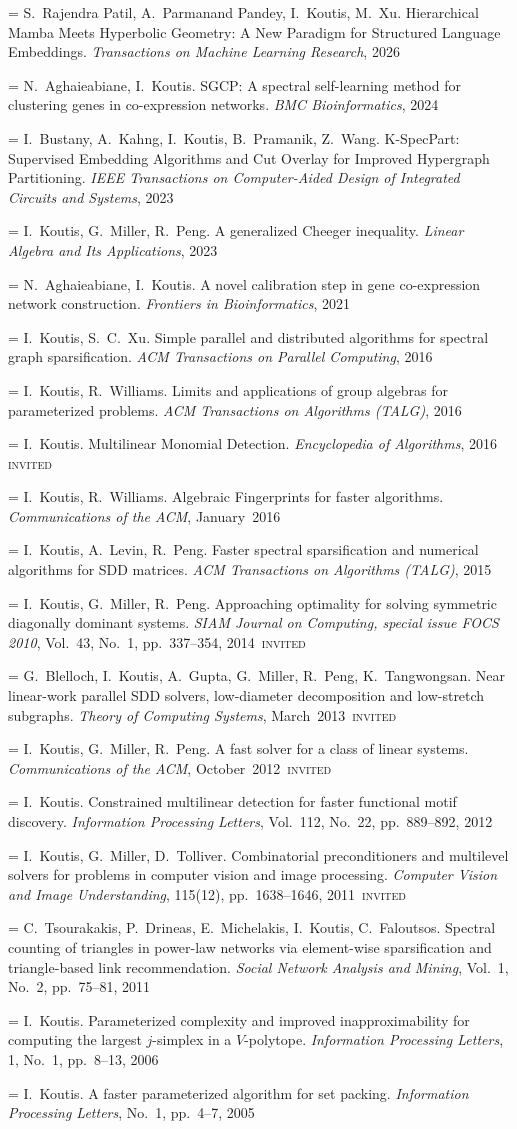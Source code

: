 \documentclass[11pt,letterpaper]{article}
\newlength{\datecol}\setlength{\datecol}{1.06in}
\newlength{\entrysep}\setlength{\entrysep}{4pt}
\newcommand{\datefont}{\small\color{muted}}
\newcommand{\badge}[1]{\,{\setlength{\fboxsep}{1.4pt}%
  \colorbox{accentlight}{\textcolor{accent}{\footnotesize\textsc{#1}}}}}
\newcommand{\me}{I.~Koutis}
\newcommand{\pub}[4]{\par\addvspace{\entrysep}\noindent\hangindent=\datecol\hangafter=1
  \makebox[\datecol][l]{\datefont [#1]}#2. #3. \textit{#4}}
\begin{document}
\pub{18}{S.~Rajendra Patil, A.~Parmanand Pandey, \me, M.~Xu}
  {Hierarchical Mamba Meets Hyperbolic Geometry: A New Paradigm for Structured Language Embeddings}
  {Transactions on Machine Learning Research}, 2026
\pub{17}{N.~Aghaieabiane, \me}
  {SGCP: A spectral self-learning method for clustering genes in co-expression networks}
  {BMC Bioinformatics}, 2024
\pub{16}{I.~Bustany, A.~Kahng, \me, B.~Pramanik, Z.~Wang}
  {K-SpecPart: Supervised Embedding Algorithms and Cut Overlay for Improved Hypergraph Partitioning}
  {IEEE Transactions on Computer-Aided Design of Integrated Circuits and Systems}, 2023
\pub{15}{\me, G.~Miller, R.~Peng}
  {A generalized Cheeger inequality}
  {Linear Algebra and Its Applications}, 2023
\pub{14}{N.~Aghaieabiane, \me}
  {A novel calibration step in gene co-expression network construction}
  {Frontiers in Bioinformatics}, 2021
\pub{13}{\me, S.~C.~Xu}
  {Simple parallel and distributed algorithms for spectral graph sparsification}
  {ACM Transactions on Parallel Computing}, 2016
\pub{12}{\me, R.~Williams}
  {Limits and applications of group algebras for parameterized problems}
  {ACM Transactions on Algorithms (TALG)}, 2016
\pub{11}{\me}
  {Multilinear Monomial Detection}
  {Encyclopedia of Algorithms}, 2016\badge{invited}
\pub{10}{\me, R.~Williams}
  {Algebraic Fingerprints for faster algorithms}
  {Communications of the ACM}, January~2016
\pub{9}{\me, A.~Levin, R.~Peng}
  {Faster spectral sparsification and numerical algorithms for SDD matrices}
  {ACM Transactions on Algorithms (TALG)}, 2015
\pub{8}{\me, G.~Miller, R.~Peng}
  {Approaching optimality for solving symmetric diagonally dominant systems}
  {SIAM Journal on Computing, special issue FOCS 2010}, Vol.~43, No.~1, pp.~337--354, 2014\badge{invited}
\pub{7}{G.~Blelloch, \me, A.~Gupta, G.~Miller, R.~Peng, K.~Tangwongsan}
  {Near linear-work parallel SDD solvers, low-diameter decomposition and low-stretch subgraphs}
  {Theory of Computing Systems}, March~2013\badge{invited}
\pub{6}{\me, G.~Miller, R.~Peng}
  {A fast solver for a class of linear systems}
  {Communications of the ACM}, October~2012\badge{invited}
\pub{5}{\me}
  {Constrained multilinear detection for faster functional motif discovery}
  {Information Processing Letters}, Vol.~112, No.~22, pp.~889--892, 2012
\pub{4}{\me, G.~Miller, D.~Tolliver}
  {Combinatorial preconditioners and multilevel solvers for problems in computer vision and image processing}
  {Computer Vision and Image Understanding}, 115(12), pp.~1638--1646, 2011\badge{invited}
\pub{3}{C.~Tsourakakis, P.~Drineas, E.~Michelakis, \me, C.~Faloutsos}
  {Spectral counting of triangles in power-law networks via element-wise sparsification and triangle-based link recommendation}
  {Social Network Analysis and Mining}, Vol.~1, No.~2, pp.~75--81, 2011
\pub{2}{\me}
  {Parameterized complexity and improved inapproximability for computing the largest $j$-simplex in a $V$-polytope}
  {Information Processing Letters}, 1, No.~1, pp.~8--13, 2006
\pub{1}{\me}
  {A faster parameterized algorithm for set packing}
  {Information Processing Letters}, No.~1, pp.~4--7, 2005
\end{document}
